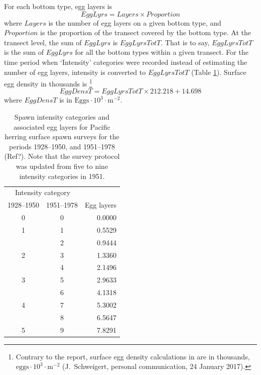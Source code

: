 \documentclass[12pt]{article}
\begin{document}
For each bottom type, egg layers is
\begin{equation}
EggLyrs = Layers \times Proportion
\label{eqEggLayersSurf}
\end{equation}
where $Layers$ is the number of egg layers on a given bottom type, and $Proportion$ is the proportion of the transect covered by the bottom type.
At the transect level, the sum of $EggLyrs$ is $EggLyrsTotT$.
That is to say, $EggLyrsTotT$ is the sum of $EggLyrs$ for all the bottom types within a given transect.
For the time period when `Intensity' categories were recorded instead of estimating the number of egg layers, intensity is converted to $EggLyrsTotT$ (Table \ref{tabIntensity}).
Surface egg density in thousands is \citep{SchweigertEtal1997}%
\footnote{Contrary to the report, surface egg density calculations in \citet{SchweigertEtal1997} are in thousands, $\text{eggs} \cdot 10^{3} \cdot \text{m}^{-2}$ (J.~Schweigert, personal communication, 24 January 2017).}
\begin{equation}
EggDensT = EggLyrsTotT \times 212.218 + 14.698
\label{eqEggDensSurf}
\end{equation}
where $EggDensT$ is in $\text{Eggs} \cdot 10^{3} \cdot \text{m}^{-2}$. 

\begin{table}
\centering
\caption[Spawn intensity categories and associated egg layers for Pacific herring surface spawn surveys]
{Spawn intensity categories and associated egg layers for Pacific herring surface spawn surveys for the periods 1928--1950, and 1951--1978 (Ref?).
Note that the survey protocol was updated from five to nine intensity categories in 1951.}
\begin{tabular}{ccr}
\toprule
\multicolumn{2}{c}{Intensity category} & \\
1928--1950 & 1951--1978 & Egg layers\\
\midrule
0 & 0 & 0.0000 \\
1 & 1 & 0.5529 \\
 & 2 & 0.9444 \\
2 & 3 & 1.3360 \\
 & 4 & 2.1496 \\
3 & 5 & 2.9633 \\
 & 6 & 4.1318 \\
4 & 7 & 5.3002 \\
 & 8 & 6.5647 \\
5 & 9 & 7.8291 \\
\bottomrule
\end{tabular}
\label{tabIntensity}
\end{table}
\end{document}
